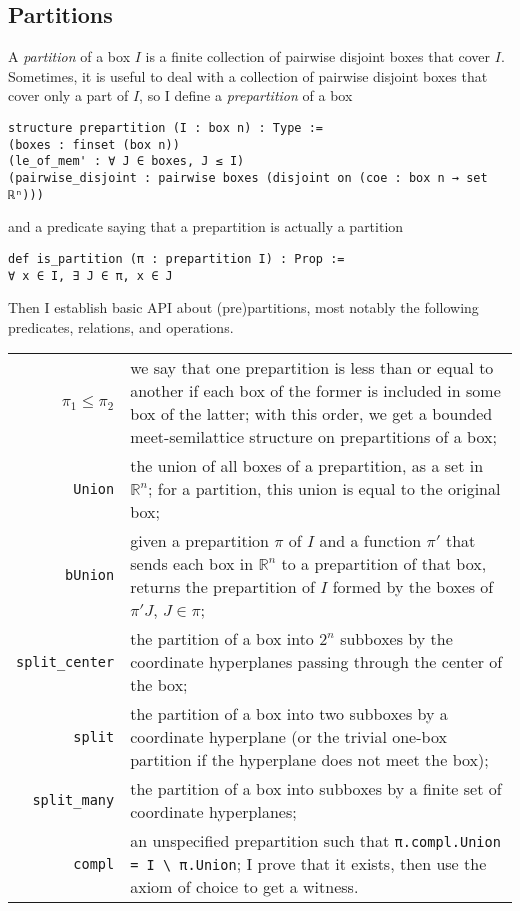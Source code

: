 \documentclass[a4paper, UKenglish,cleveref, autoref, thm-restate]{lipics-v2021}
\newcommand{\bbR}{\mathbb{R}}
\begin{document}
\subsection{Partitions}\label{sec:partitions}

A \emph{partition} of a box \(I\) is a finite collection of pairwise
disjoint boxes that cover \(I\). Sometimes, it is useful to deal with a
collection of pairwise disjoint boxes that cover only a part of \(I\),
so I define a \emph{prepartition} of a box

\begin{lstlisting}
structure prepartition (I : box n) : Type :=
(boxes : finset (box n))
(le_of_mem' : ∀ J ∈ boxes, J ≤ I)
(pairwise_disjoint : pairwise boxes (disjoint on (coe : box n → set ℝⁿ)))
\end{lstlisting}

and a predicate saying that a prepartition is actually a partition

\begin{lstlisting}
def is_partition (π : prepartition I) : Prop :=
∀ x ∈ I, ∃ J ∈ π, x ∈ J
\end{lstlisting}

Then I establish basic API about (pre)partitions, most notably the
following predicates, relations, and operations.

\noindent%
\begin{tabular}{rp{10cm}}
  \(\pi_{1}\le\pi_{2}\)&we say that one prepartition is less than or equal to another if each box of the former is included in some box of the latter; with this order, we get a bounded meet-semilattice structure on prepartitions of a box;\\
  \lstinline=Union=&the union of all boxes of a prepartition, as a set in \(\bbR^{n}\); for a partition, this union is equal to the original box;\\
  \lstinline=bUnion=&given a prepartition \(\pi\) of \(I\) and a function \(\pi'\) that sends each box in \(\bbR^{n}\) to a prepartition of that box, returns the prepartition of \(I\) formed by the boxes of \(\pi' J\), \(J \in \pi\);\\
  \lstinline=split_center=&the partition of a box into \(2^{n}\) subboxes by the coordinate hyperplanes passing through the center of the box;\\
  \lstinline=split=&the partition of a box into two subboxes by a coordinate hyperplane (or the trivial one-box partition if the hyperplane does not meet the box);\\
  \lstinline=split_many=&the partition of a box into subboxes by a finite set of coordinate hyperplanes;\\
  \lstinline=compl=&an unspecified prepartition such that \lstinline~π.compl.Union = I \ π.Union~; I prove that it exists, then use the axiom of choice to get a witness.
\end{tabular}
\end{document}
